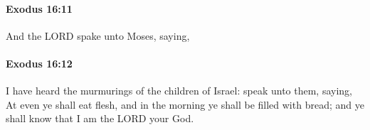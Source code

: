 		\paragraph{Exodus 16:11} %
			\label{EXODUS-16-11}

			And the LORD spake unto Moses, saying,


		\paragraph{Exodus 16:12} %
			\label{EXODUS-16-12}

			I have heard the murmurings of the children of Israel: speak unto them, saying, At even ye shall eat flesh, and in the morning ye shall be filled with bread; and ye shall know that I am the LORD your God.



